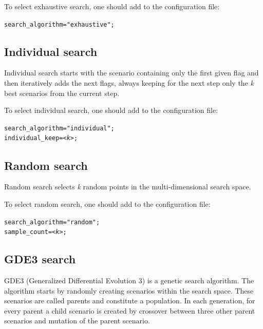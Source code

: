 \documentclass[11pt,a4paper, oneside]{book} %
\begin{document}
To select exhaustive search, one should add to the configuration file:
\begin{center}
\begin{minipage}{0.8\textwidth}
	\texttt{search\_algorithm="exhaustive";}
\end{minipage}
\end{center}

\subsection{Individual search}
Individual search starts with the scenario containing only the first given flag and then iteratively adds the next flags, always keeping for the next step only the \textit{k} best scenarios from the current step.

To select individual search, one should add to the configuration file:
\begin{center}
\begin{minipage}{0.8\textwidth}
	\texttt{search\_algorithm="individual";\\
	individual\_keep=\textit{<k>};}
\end{minipage}
\end{center}


\subsection{Random search}
Random search selects \textit{k} random points in the multi-dimensional search space.

To select random search, one should add to the configuration file:
\begin{center}
\begin{minipage}{0.8\textwidth}
	\texttt{search\_algorithm="random";\\
	sample\_count=\textit{<k>};}
\end{minipage}
\end{center}

\subsection{GDE3 search}

GDE3 (Generalized Differential Evolution 3) is a genetic search algorithm. The algorithm starts by randomly creating scenarios within the search space. These scenarios are called parents and constitute a population. In each generation, for every parent a child scenario is created by crossover between three other parent scenarios and mutation of the parent scenario.
\end{document}
